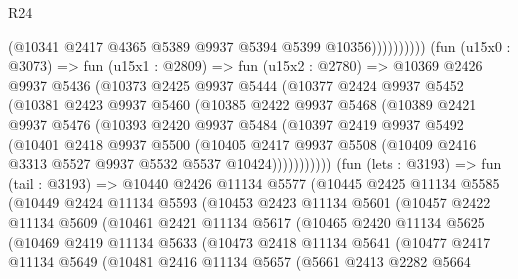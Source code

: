 \begin{lexlean}{R24}
\begin{coremodule}
                          (@10341 @2417 @4365 @5389 @9937 @5394 @5399 @10356))))))))))
        (fun (u15x0 : @3073) =>
        fun (u15x1 : @2809) =>
        fun (u15x2 : @2780) =>
        @10369
          @2426
          @9937
          @5436
          (@10373
            @2425
            @9937
            @5444
            (@10377
              @2424
              @9937
              @5452
              (@10381
                @2423
                @9937
                @5460
                (@10385
                  @2422
                  @9937
                  @5468
                  (@10389
                    @2421
                    @9937
                    @5476
                    (@10393
                      @2420
                      @9937
                      @5484
                      (@10397
                        @2419
                        @9937
                        @5492
                        (@10401
                          @2418
                          @9937
                          @5500
                          (@10405
                            @2417
                            @9937
                            @5508
                            (@10409 @2416 @3313 @5527 @9937 @5532 @5537 @10424)))))))))))
        (fun (lets : @3193) =>
        fun (tail : @3193) =>
        @10440
          @2426
          @11134
          @5577
          (@10445
            @2425
            @11134
            @5585
            (@10449
              @2424
              @11134
              @5593
              (@10453
                @2423
                @11134
                @5601
                (@10457
                  @2422
                  @11134
                  @5609
                  (@10461
                    @2421
                    @11134
                    @5617
                    (@10465
                      @2420
                      @11134
                      @5625
                      (@10469
                        @2419
                        @11134
                        @5633
                        (@10473
                          @2418
                          @11134
                          @5641
                          (@10477
                            @2417
                            @11134
                            @5649
                            (@10481
                              @2416
                              @11134
                              @5657
                              (@5661
                                @2413
                                @2282
                                @5664

\end{coremodule}
\end{lexlean}
